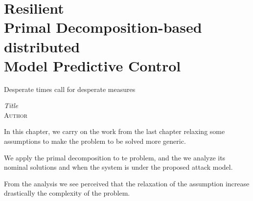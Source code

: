\documentclass[../main.tex]{subfiles}
\begin{document}
\chapter[Resilient Primal Decomposition-based dMPC]{Resilient \\Primal Decomposition-based \\distributed \\Model Predictive Control}\label{sec:safe_pddmpc_ineq}
\epigraph{\centering Desperate times call for desperate measures}
{\textit{Title}\\\textsc{Author}}

In this chapter, we carry on the work from the last chapter relaxing some assumptions to make the problem to be solved more generic.

We apply the primal decomposition to te problem,  and the we analyze its nominal solutions and when the system is under the proposed attack model.

From the analysis we see perceived that the relaxation of the assumption increase drastically the complexity of the problem.


\minitoc
\end{document}
